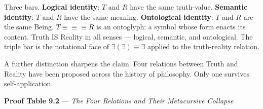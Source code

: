 \documentclass[10pt, openany, oneside]{book}
\begin{document}
Three bars. \textbf{Logical identity}: $T$ and $R$ have the same truth-value. \textbf{Semantic identity}: $T$ and $R$ have the same meaning. \textbf{Ontological identity}: $T$ and $R$ are the same Being. $T \equiv\!\equiv\!\equiv R$ is an ontoglyph: a symbol whose form enacts its content. Truth IS Reality in all senses --- logical, semantic, and ontological. The triple bar is the notational face of $\exists(\exists) \equiv \exists$ applied to the truth-reality relation.

A further distinction sharpens the claim. Four relations between Truth and Reality have been proposed across the history of philosophy. Only one survives self-application.

\vspace{0.5em}

\textbf{Proof Table 9.2} --- \textit{The Four Relations and Their Metacursive Collapse}

\vspace{0.5em}
\end{document}
